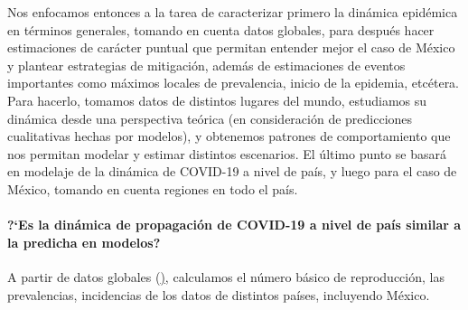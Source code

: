 \documentclass[8pt]{article}
\begin{document}
Nos enfocamos entonces a la tarea de caracterizar primero la dinámica epidémica en términos generales, tomando en cuenta datos globales, para después hacer estimaciones de carácter puntual que permitan entender mejor el caso de México y plantear estrategias de mitigación, además de estimaciones de eventos importantes como máximos locales de prevalencia, inicio de la epidemia, etcétera. Para hacerlo, tomamos datos de distintos lugares del mundo, estudiamos su dinámica desde una perspectiva teórica (en consideración de predicciones cualitativas hechas por modelos), y obtenemos patrones de comportamiento que nos permitan modelar y estimar distintos escenarios. El último punto se basará en modelaje de la dinámica de COVID-19 a nivel de país, y luego para el caso de México, tomando en cuenta regiones en todo el país. 

\paragraph{?`Es la dinámica de propagación de COVID-19 a nivel de país similar a la predicha en modelos?}

A partir de datos globales (\href{}), calculamos el número básico de reproducción, las prevalencias, incidencias de los datos de distintos países, incluyendo México. 
\end{document}
